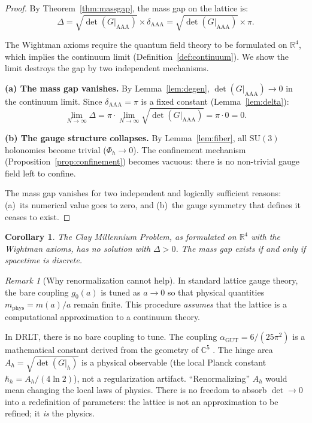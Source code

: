 \documentclass[12pt]{article}
\newtheorem{corollary}[theorem]{Corollary}
\theoremstyle{remark}
\newtheorem{remark}[theorem]{Remark}
\theoremstyle{definition}
\newcommand{\CC}{\mathbb{C}}
\newcommand{\RR}{\mathbb{R}}
\newcommand{\agut}{\alpha_{\mathrm{GUT}}}
\begin{document}
\begin{proof}
By Theorem~\ref{thm:massgap}, the mass gap on the lattice is:
\begin{equation}
\Delta = \sqrt{\det(G|_{\mathrm{AAA}})} \times \delta_{\mathrm{AAA}}
= \sqrt{\det(G|_{\mathrm{AAA}})} \times \pi.
\end{equation}

The Wightman axioms require the quantum field theory to be formulated on
$\RR^4$, which implies the continuum limit
(Definition~\ref{def:continuum}).  We show the limit destroys the gap
by two independent mechanisms.

\medskip\noindent
\textbf{(a) The mass gap vanishes.}
By Lemma~\ref{lem:degen}, $\det(G|_{\mathrm{AAA}}) \to 0$ in the
continuum limit.  Since $\delta_{\mathrm{AAA}} = \pi$ is a fixed
constant (Lemma~\ref{lem:delta}):
\begin{equation}
\lim_{N \to \infty} \Delta
= \pi \cdot \lim_{N \to \infty} \sqrt{\det(G|_{\mathrm{AAA}})}
= \pi \cdot 0 = 0.
\end{equation}

\medskip\noindent
\textbf{(b) The gauge structure collapses.}
By Lemma~\ref{lem:fiber}, all $\mathrm{SU}(3)$ holonomies become
trivial ($\Phi_h \to 0$).  The confinement mechanism
(Proposition~\ref{prop:confinement}) becomes vacuous: there is no
non-trivial gauge field left to confine.

\medskip\noindent
The mass gap vanishes for two independent and logically sufficient
reasons: (a)~its numerical value goes to zero, and (b)~the gauge
symmetry that defines it ceases to exist.
\end{proof}

\begin{corollary}
The Clay Millennium Problem, as formulated on $\RR^4$ with the
Wightman axioms, has no solution with $\Delta > 0$. The mass gap exists
if and only if spacetime is discrete.
\end{corollary}

\begin{remark}[Why renormalization cannot help]
In standard lattice gauge theory, the bare coupling $g_0(a)$ is tuned as
$a \to 0$ so that physical quantities $m_{\mathrm{phys}} = m(a)/a$
remain finite. This procedure \emph{assumes} that the lattice is a
computational approximation to a continuum theory.

In DRLT, there is no bare coupling to tune. The coupling
$\agut = 6/(25\pi^2)$ is a mathematical constant
derived from the geometry of $\CC^5$ . The hinge
area $A_h = \sqrt{\det(G|_h)}$ is a physical observable (the local
Planck constant $\hbar_h = A_h/(4\ln 2)$), not a regularization
artifact. ``Renormalizing'' $A_h$ would mean changing the local laws of
physics. There is no freedom to absorb $\det \to 0$ into a redefinition
of parameters: the lattice is not an approximation to be refined; it
\emph{is} the physics.
\end{remark}
\end{document}
